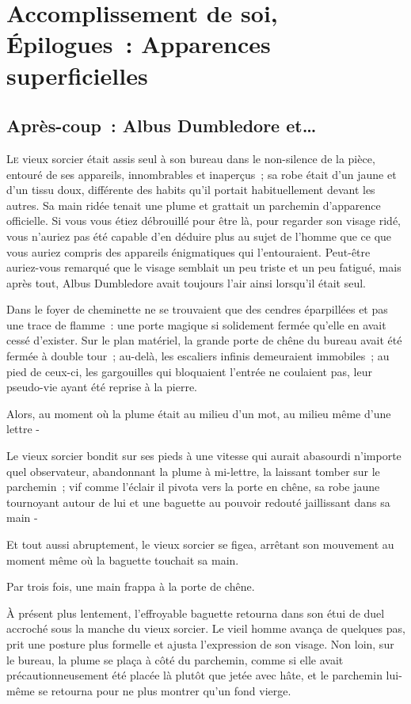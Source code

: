 \chapter{Accomplissement de soi, Épilogues~: Apparences superficielles}

\section{Après-coup~: Albus Dumbledore et…}

\lettrine{L}{e} vieux sorcier était assis seul à son bureau dans le non-silence de la pièce, entouré de ses appareils, innombrables et inaperçus~; sa robe était d'un jaune et d'un tissu doux, différente des habits qu'il portait habituellement devant les autres. Sa main ridée tenait une plume et grattait un parchemin d'apparence officielle. Si vous vous étiez débrouillé pour être là, pour regarder son visage ridé, vous n'auriez pas été capable d'en déduire plus au sujet de l'homme que ce que vous auriez compris des appareils énigmatiques qui l'entouraient. Peut-être auriez-vous remarqué que le visage semblait un peu triste et un peu fatigué, mais après tout, Albus Dumbledore avait toujours l'air ainsi lorsqu'il était seul.

Dans le foyer de cheminette ne se trouvaient que des cendres éparpillées et pas une trace de flamme~: une porte magique si solidement fermée qu'elle en avait cessé d'exister. Sur le plan matériel, la grande porte de chêne du bureau avait été fermée à double tour~; au-delà, les escaliers infinis demeuraient immobiles~; au pied de ceux-ci, les gargouilles qui bloquaient l'entrée ne coulaient pas, leur pseudo-vie ayant été reprise à la pierre.

Alors, au moment où la plume était au milieu d'un mot, au milieu même d'une lettre -

Le vieux sorcier bondit sur ses pieds à une vitesse qui aurait abasourdi n'importe quel observateur, abandonnant la plume à mi-lettre, la laissant tomber sur le parchemin~; vif comme l'éclair il pivota vers la porte en chêne, sa robe jaune tournoyant autour de lui et une baguette au pouvoir redouté jaillissant dans sa main -

Et tout aussi abruptement, le vieux sorcier se figea, arrêtant son mouvement au moment même où la baguette touchait sa main.

Par trois fois, une main frappa à la porte de chêne.

À présent plus lentement, l'effroyable baguette retourna dans son étui de duel accroché sous la manche du vieux sorcier. Le vieil homme avança de quelques pas, prit une posture plus formelle et ajusta l'expression de son visage. Non loin, sur le bureau, la plume se plaça à côté du parchemin, comme si elle avait précautionneusement été placée là plutôt que jetée avec hâte, et le parchemin lui-même se retourna pour ne plus montrer qu'un fond vierge.

